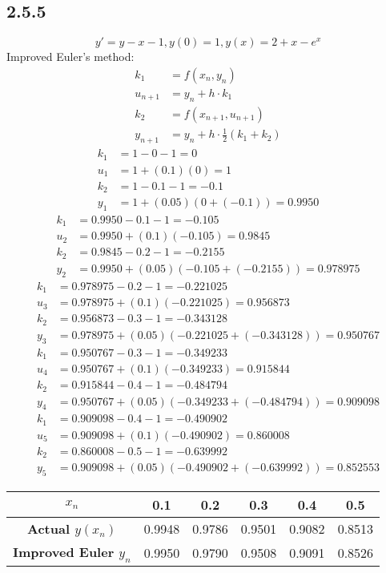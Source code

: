 \documentclass{article}
\begin{document}
\subsection{2.5.5}
$$ y' = y - x - 1, y(0) = 1, y(x) = 2 + x - e^x $$
Improved Euler's method:
\begin{align*}
	k_1 & = f(x_n,y_n) \\
	u_{n+1} & = y_n + h \cdot k_1 \\
	k_2 & = f(x_{n+1},u_{n+1}) \\
	y_{n+1} & = y_n + h \cdot \frac{1}{2}(k_1 + k_2)
\end{align*}
\begin{align*}
	k_1 & = 1 - 0 - 1 = 0 \\
	u_1 & = 1 + (0.1)(0) = 1 \\
	k_2 & = 1 - 0.1 - 1 = -0.1 \\
	y_1 & = 1 + (0.05)(0 + (-0.1)) = 0.9950
\end{align*}
\begin{align*}
	k_1 & = 0.9950 - 0.1 - 1 = -0.105 \\
	u_2 & = 0.9950 + (0.1)(-0.105) = 0.9845 \\
	k_2 & = 0.9845 - 0.2 - 1 = -0.2155 \\
	y_2 & = 0.9950 + (0.05)(-0.105 + (-0.2155)) = 0.978975
\end{align*}
\begin{align*}
	k_1 & = 0.978975 - 0.2 - 1 = -0.221025 \\
	u_3 & = 0.978975 + (0.1)(-0.221025) = 0.956873 \\
	k_2 & = 0.956873 - 0.3 - 1 = -0.343128 \\
	y_3 & = 0.978975 + (0.05)(-0.221025 + (-0.343128)) = 0.950767
\end{align*}
\begin{align*}
	k_1 & = 0.950767 - 0.3 - 1 = -0.349233 \\
	u_4 & = 0.950767 + (0.1)(-0.349233) = 0.915844 \\
	k_2 & = 0.915844 - 0.4 - 1 = -0.484794 \\
	y_4 & = 0.950767 + (0.05)(-0.349233 + (-0.484794)) = 0.909098
\end{align*}
\begin{align*}
	k_1 & = 0.909098 - 0.4 - 1 = -0.490902 \\
	u_5 & = 0.909098 + (0.1)(-0.490902) = 0.860008 \\
	k_2 & = 0.860008 - 0.5 - 1 = -0.639992 \\
	y_5 & = 0.909098 + (0.05)(-0.490902 + (-0.639992)) = 0.852553
\end{align*}
\begin{tabular}{ | c | c | c | c | c | c | }
	\textbf{$ x_n $} & 0.1 & 0.2 & 0.3 & 0.4 & 0.5 \\
	\hline
	\textbf{Actual $ y \left( x_n \right) $} & 0.9948 & 0.9786 & 0.9501 & 0.9082 & 0.8513 \\
	\hline
	\textbf{Improved Euler $ y_n $} & 0.9950 & 0.9790 & 0.9508 & 0.9091 & 0.8526
\end{tabular}
\end{document}
